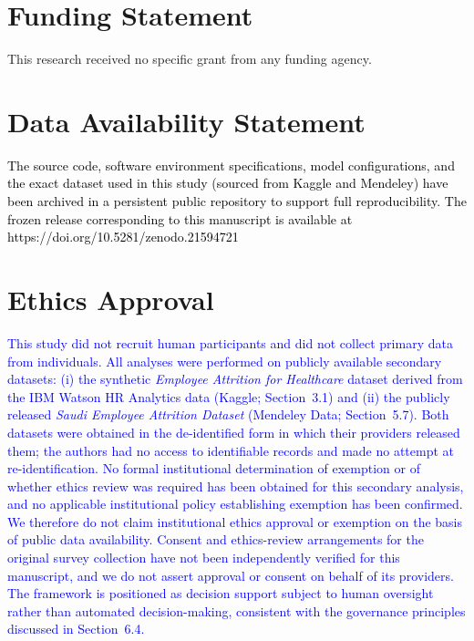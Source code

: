 \documentclass[a4paper,fleqn]{cas-sc}
\begin{document}
{\section*{Funding Statement}
This research received no specific grant from any funding agency.

\section*{Data Availability Statement}
\textcolor{black}{The source code, software environment specifications, model configurations, and the exact dataset used in this study (sourced from Kaggle and Mendeley) have been archived in a persistent public repository to support full reproducibility. The frozen release corresponding to this manuscript is available at https://doi.org/10.5281/zenodo.21594721}
\section*{Ethics Approval}
\textcolor{blue}{This study did not recruit human participants and did not collect primary data from individuals. All analyses were performed on publicly available secondary datasets: (i) the synthetic \emph{Employee Attrition for Healthcare} dataset derived from the IBM Watson HR Analytics data (Kaggle; Section~3.1) and (ii) the publicly released \emph{Saudi Employee Attrition Dataset} (Mendeley Data; Section~5.7). Both datasets were obtained in the de-identified form in which their providers released them; the authors had no access to identifiable records and made no attempt at re-identification. No formal institutional determination of exemption or of whether ethics review was required has been obtained for this secondary analysis, and no applicable institutional policy establishing exemption has been confirmed. We therefore do not claim institutional ethics approval or exemption on the basis of public data availability. Consent and ethics-review arrangements for the original survey collection have not been independently verified for this manuscript, and we do not assert approval or consent on behalf of its providers. The framework is positioned as decision support subject to human oversight rather than automated decision-making, consistent with the governance principles discussed in Section~6.4.}

\printcredits


% 

}
\end{document}
